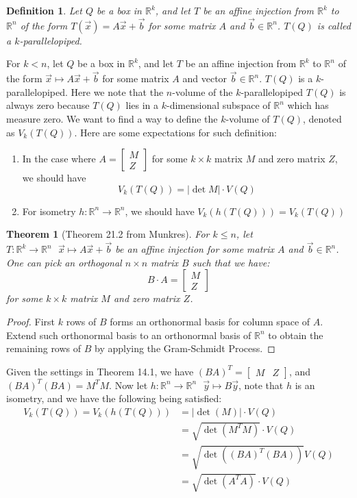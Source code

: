 \documentclass[11pt,oneside]{book}
\theoremstyle{break}
\theoremstyle{break}
\newtheorem{thm}{Theorem}[section]
\newtheorem{defn}{Definition}[corL]
\newcommand{\R}{\mathbb{R}}
\newcommand{\bmat}[1]{\begin{bmatrix} #1 \end{bmatrix}}
\begin{document}
\begin{defn}
Let $Q$ be a box in $\R^k$, and let $T$ be an affine injection from $\R^k$ to $\R^n$ of the form $T(\vec{x}) = A\vec{x}+\vec{b}$ for some matrix $A$ and $\vec{b}\in \R^n$. $T(Q)$ is called a $k$-parallelopiped.
\end{defn}

For $k<n$, let $Q$ be a box in $\R^k$, and let $T$ be an affine injection from $\R^k$ to $\R^n$ of the form $\vec{x}\mapsto A\vec{x}+\vec{b}$ for some matrix $A$ and vector $\vec{b}\in \R^n$. $T(Q)$ is a $k$-parallelopiped. Here we note that the $n$-volume of the $k$-parallelopiped $T(Q)$ is always zero because $T(Q)$ lies in a $k$-dimensional subspace of $\R^n$ which has measure zero. We want to find a way to define the $k$-volume of $T(Q)$, denoted as $V_k(T(Q))$. Here are some expectations for such definition: 
\begin{enumerate}[topsep=3pt,itemsep=-1ex,partopsep=1ex,parsep=1ex]
\item In the case where $A = \bmat{M \\ Z}$ for some $k\times k$ matrix $M$ and zero matrix $Z$, we should have $$V_k(T(Q))= |\det M|\cdot V(Q)$$
\item For isometry $h:\R^n \to \R^n$, we should have $V_k(h(T(Q))) = V_k(T(Q))$
\end{enumerate}


\hfill\break
\begin{thm}[Theorem 21.2 from Munkres] 
For $k\leq n$, let $T:\R^k \to \R^n \ \ \ \vec{x} \mapsto A\vec{x}+\vec{b}$ be an affine injection for some matrix $A$ and $\vec{b}\in \R^n$.\\ One can pick an orthogonal $n \times n$ matrix $B$ such that we have: $$B\cdot A= \bmat{M \\ Z}$$ for some $k\times k$ matrix $M$ and zero matrix $Z$.
\end{thm}
\begin{proof}
First $k$ rows of $B$ forms an orthonormal basis for column space of $A$. Extend such orthonormal basis to an orthonormal basis of $\R^n$ to obtain the remaining rows of $B$ by applying the Gram-Schmidt Process. 
\end{proof}


Given the settings in Theorem 14.1, we have $(BA)^T = \bmat{M& Z}$, and $(BA)^T (BA) = M^TM$. Now let $h:\R^n \to \R^n \ \ \ \vec{y}\mapsto B\vec{y}$, note that $h$ is an isometry, and we have the following being satisfied:
\begin{align*}
V_k(T(Q)) = V_k(h(T(Q))) &= |\det(M)|\cdot V(Q) \\&= \sqrt{\det(M^TM)}\cdot V(Q) \\&= \sqrt{\det((BA)^T(BA))}V(Q) \\&= \sqrt{\det(A^TA)}\cdot V(Q)
\end{align*}
\end{document}

